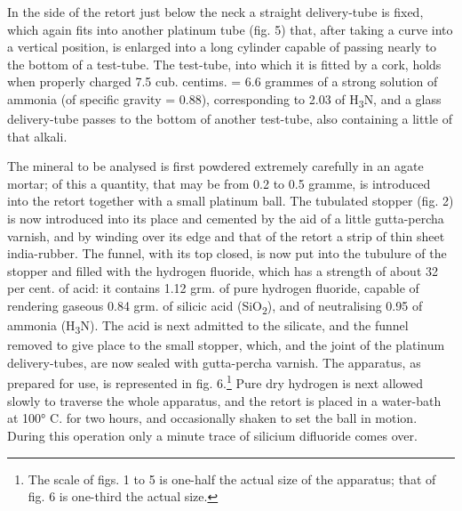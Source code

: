 \documentclass[a4paper, 12pt, oneside]{article}
\begin{document}
In the side of the retort just below the neck a straight delivery-tube is fixed, which again fits into another platinum tube (fig. 5) that, after taking a curve into a vertical position, is enlarged into a long cylinder capable of passing nearly to the bottom of a test-tube. The test-tube, into which it is fitted by a cork, holds when properly charged 7.5 cub. centims. = 6.6 grammes of a strong solution of ammonia (of specific gravity = 0.88), corresponding to 2.03 of H\textsubscript{3}N, and a glass delivery-tube passes to the bottom of another test-tube, also containing a little of that alkali.

The mineral to be analysed is first powdered extremely carefully in an agate mortar; of this a quantity, that may be from 0.2 to 0.5 gramme, is introduced into the retort together with a small platinum ball. The tubulated stopper (fig. 2) is now introduced into its place and cemented by the aid of a little gutta-percha varnish, and by winding over its edge and that of the retort a strip of thin sheet india-rubber. The funnel, with its top closed, is now put into the tubulure of the stopper and filled with the hydrogen fluoride, which has a strength of about 32 per cent. of acid: it contains 1.12 grm. of pure hydrogen fluoride, capable of rendering gaseous 0.84 grm. of silicic acid (SiO\textsubscript{2}), and of neutralising 0.95 of ammonia (H\textsubscript{3}N). The acid is next admitted to the silicate, and the funnel removed to give place to the small stopper, which, and the joint of the platinum delivery-tubes, are now sealed with gutta-percha varnish. The apparatus, as prepared for use, is represented in fig. 6.\footnote{The scale of figs. 1 to 5 is one-half the actual size of the apparatus; that of fig. 6 is one-third the actual size.} Pure dry hydrogen is next allowed slowly to traverse the whole apparatus, and the retort is placed in a water-bath at 100° C. for two hours, and occasionally shaken to set the ball in motion. During this operation only a minute trace of silicium difluoride comes over.
\end{document}

